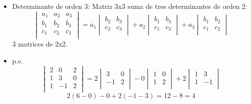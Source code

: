 \documentclass{article}
\begin{document}
\begin{itemize}
    \item Determinante de orden 3: Matriz 3x3 suma de tres determinantes de orden 2:
        \begin{equation*}
            \begin{vmatrix}
                a_{1} & a_{2} & a_{3} \\ 
                b_{1} & b_{2} & b_{3} \\ 
                c_{1} & c_{2} & c_{3} \\ 
            \end{vmatrix}
            = a_{1}\begin{vmatrix}
                b_{2} & b_{3} \\ 
                c_{2} & c_{3} \\ 
            \end{vmatrix} + a_{2}
            \begin{vmatrix}
                b_1 &  b_3 \\ 
                c_1 & c_3 \\  
            \end{vmatrix} + a_3 \begin{vmatrix}
                b_1 & b_2 \\ 
                c_1 & c_2 \\ 
            \end{vmatrix}
        \end{equation*}
        3 matrices de 2x2.
    
    \item p.e. \begin{equation*}
        \begin{vmatrix}
            2&0&2\\ 
            1&3&0\\
            1&-1&2\\
        \end{vmatrix} = 2 \begin{vmatrix}
            3 & 0 \\ 
            -1 & 2 \\ 
        \end{vmatrix} - 0 \begin{vmatrix}
            1 & 0 \\ 
            1 & 2 \\ 
        \end{vmatrix} + 2 \begin{vmatrix}
            1 & 3 \\ 
            1 & -1 \\ 
        \end{vmatrix}
    \end{equation*}
    \[
      2(6-0)-0 + 2(-1-3) = 12 - 8 = 4 
    \]


\end{itemize}
\end{document}
